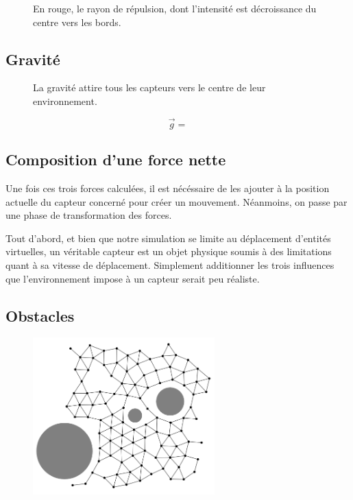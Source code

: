 \documentclass[10pt]{article}
\begin{document}
\begin{multicols}{2}
\begin{figure}[H]

  \centering

  

  \caption{En rouge, le rayon de répulsion, dont l'intensité est
    décroissance du centre vers les bords.}
  \label{repulsion}

\end{figure}

\subsection{Gravité}

\begin{figure}[H]

  \centering

  

  \caption{La gravité attire tous les capteurs vers le centre de leur
    environnement.}
  \label{gravite}

\end{figure}

$$
\vec{g} =
$$

\subsection{Composition d'une force nette}

Une fois ces trois forces calculées, il est nécéssaire de les ajouter
à la position actuelle du capteur concerné pour créer un
mouvement. Néanmoins, on passe par une phase de transformation des
forces.

Tout d'abord, et bien que notre simulation se limite au déplacement
d'entités virtuelles, un véritable capteur est un objet physique
soumis à des limitations quant à sa vitesse de déplacement. Simplement
additionner les trois influences que l'environnement impose à un
capteur serait peu réaliste.

\subsection{Obstacles}

\begin{figure}[H]

  \centering

  \includegraphics[width=7cm]{obstacles.png}


\end{figure}
\end{multicols}
\end{document}

